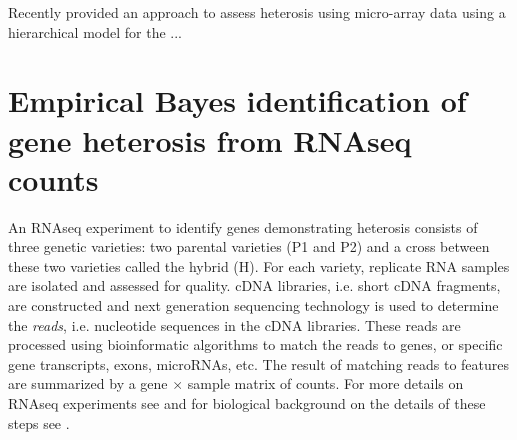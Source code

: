 \documentclass[useAMS,usenatbib,referee]{biom}
\begin{document}
Recently \citep{ji2014estimation} provided an approach to assess heterosis using micro-array data using a hierarchical model for the ...


% 
% 
% 


\section{Empirical Bayes identification of gene heterosis from RNAseq counts}
\label{s:method}

An RNAseq experiment to identify genes demonstrating heterosis consists of three genetic varieties: two parental varieties (P1 and P2) and a cross between these two varieties called the hybrid (H). For each variety, replicate RNA samples are isolated and assessed for quality. cDNA libraries, i.e. short cDNA fragments, are constructed and next generation sequencing technology is used to determine the \emph{reads}, i.e. nucleotide sequences in the cDNA libraries. These reads are processed using bioinformatic algorithms to match the reads to genes, or specific gene transcripts, exons, microRNAs, etc. The result of matching reads to features are summarized by a gene $\times$ sample matrix of counts. For more details on RNAseq experiments see \cite{nettleton2014design} and for biological background on the details of these steps see \cite{paschold2012complementation}.
\end{document}
